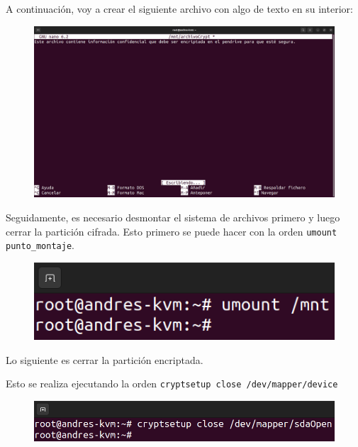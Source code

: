 \documentclass{article}
\begin{document}
\newpage

A continuación, voy a crear el siguiente archivo con algo de texto en su interior:

\begin{figure}[H]
    \includegraphics[width=\textwidth]{imagenes/Captura desde 2022-10-30 10-59-27.png}
\end{figure}

\bigskip

Seguidamente, es necesario desmontar el sistema de archivos primero y luego cerrar la partición cifrada. Esto primero se puede hacer con la orden \verb|umount punto_montaje|.

\begin{figure}[H]
    \includegraphics[width=\textwidth]{imagenes/Captura desde 2022-10-30 11-00-34.png}
\end{figure}

\bigskip

Lo siguiente es cerrar la partición encriptada.

Esto se realiza ejecutando la orden \verb|cryptsetup close /dev/mapper/device|


\begin{figure}[H]
    \includegraphics[width=\textwidth]{imagenes/Captura desde 2022-10-30 11-02-02.png}
\end{figure}
\end{document}
